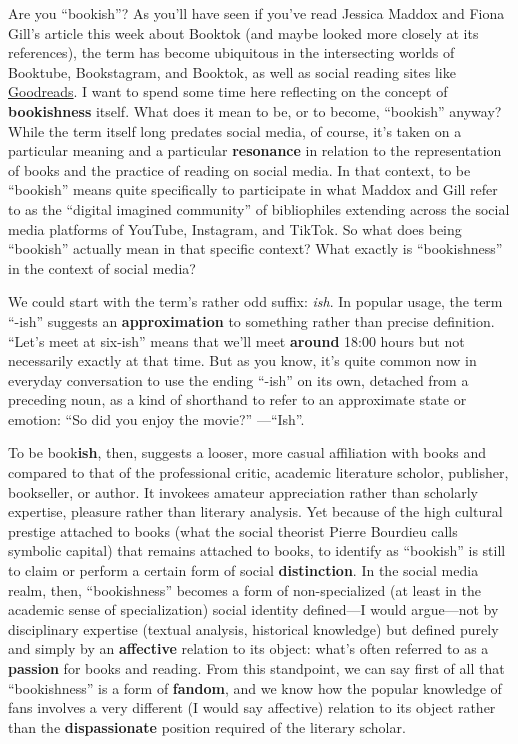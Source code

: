 \documentclass[
  letterpaper,
  DIV=11,
  numbers=noendperiod,
  oneside]{scrartcl}
\begin{document}
Are you ``bookish''? As you'll have seen if you've read Jessica Maddox
and Fiona Gill's article this week about Booktok (and maybe looked more
closely at its references), the term has become ubiquitous in the
intersecting worlds of Booktube, Bookstagram, and Booktok, as well as
social reading sites like \href{https://www.goodreads.com/}{Goodreads}.
I want to spend some time here reflecting on the concept of
\textbf{bookishness} itself. What does it mean to be, or to become,
``bookish'' anyway? While the term itself long predates social media, of
course, it's taken on a particular meaning and a particular
\textbf{resonance} in relation to the representation of books and the
practice of reading on social media. In that context, to be ``bookish''
means quite specifically to participate in what Maddox and Gill refer to
as the ``digital imagined community'' of bibliophiles extending across
the social media platforms of YouTube, Instagram, and TikTok. So what
does being ``bookish'' actually mean in that specific context? What
exactly is ``bookishness'' in the context of social media?

We could start with the term's rather odd suffix: \emph{ish}. In popular
usage, the term ``-ish'' suggests an \textbf{approximation} to something
rather than precise definition. ``Let's meet at six-ish'' means that
we'll meet \textbf{around} 18:00 hours but not necessarily exactly at
that time. But as you know, it's quite common now in everyday
conversation to use the ending ``-ish'' on its own, detached from a
preceding noun, as a kind of shorthand to refer to an approximate state
or emotion: ``So did you enjoy the movie?'' ---``Ish''.

To be book\textbf{ish}, then, suggests a looser, more casual affiliation
with books and compared to that of the professional critic, academic
literature scholor, publisher, bookseller, or author. It invokees
amateur appreciation rather than scholarly expertise, pleasure rather
than literary analysis. Yet because of the high cultural prestige
attached to books (what the social theorist Pierre Bourdieu calls
symbolic capital) that remains attached to books, to identify as
``bookish'' is still to claim or perform a certain form of social
\textbf{distinction}. In the social media realm, then, ``bookishness''
becomes a form of non-specialized (at least in the academic sense of
specialization) social identity defined---I would argue---not by
disciplinary expertise (textual analysis, historical knowledge) but
defined purely and simply by an \textbf{affective} relation to its
object: what's often referred to as a \textbf{passion} for books and
reading. From this standpoint, we can say first of all that
``bookishness'' is a form of \textbf{fandom}, and we know how the
popular knowledge of fans involves a very different (I would say
affective) relation to its object rather than the \textbf{dispassionate}
position required of the literary scholar.
\end{document}
